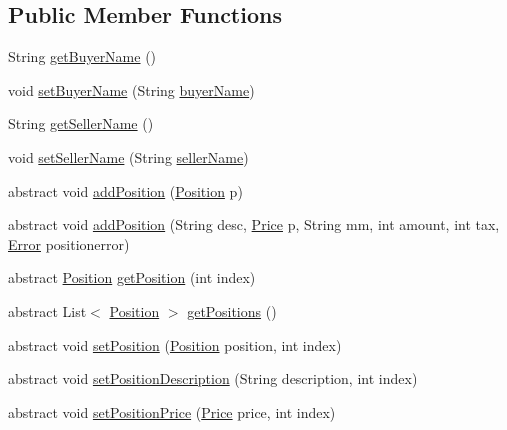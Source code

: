 \subsection*{Public Member Functions}
\begin{DoxyCompactItemize}
\item 
String \hyperlink{class_reduced_invoice_1_1_a_invoice_a0099d82cccbb09bc9240269c76c079d4}{get\+Buyer\+Name} ()
\item 
void \hyperlink{class_reduced_invoice_1_1_a_invoice_ab47710855319e2cf64a829d9bb37d243}{set\+Buyer\+Name} (String \hyperlink{class_reduced_invoice_1_1_a_invoice_ae75bdd20da8fa21dec01c2d032ac11c5}{buyer\+Name})
\item 
String \hyperlink{class_reduced_invoice_1_1_a_invoice_ac8973df8a999bc5556d697ed17c871f7}{get\+Seller\+Name} ()
\item 
void \hyperlink{class_reduced_invoice_1_1_a_invoice_a45129f98801ec280c52c2de35b48da0b}{set\+Seller\+Name} (String \hyperlink{class_reduced_invoice_1_1_a_invoice_ae00a97e1c74841fe0b0b43fccd1da24d}{seller\+Name})
\item 
abstract void \hyperlink{class_reduced_invoice_1_1_a_invoice_a29b30209d39ee91edee303ba5d36fd81}{add\+Position} (\hyperlink{class_reduced_invoice_1_1_position}{Position} p)
\item 
abstract void \hyperlink{class_reduced_invoice_1_1_a_invoice_a0ccc4c6c378676635b552e12c6a7d690}{add\+Position} (String desc, \hyperlink{class_reduced_invoice_1_1_price}{Price} p, String mm, int amount, int tax, \hyperlink{enum_reduced_invoice_1_1_a_invoice_1_1_error}{Error} positionerror)
\item 
abstract \hyperlink{class_reduced_invoice_1_1_position}{Position} \hyperlink{class_reduced_invoice_1_1_a_invoice_a1264648436c734afc549b2d1adb20ff6}{get\+Position} (int index)
\item 
abstract List$<$ \hyperlink{class_reduced_invoice_1_1_position}{Position} $>$ \hyperlink{class_reduced_invoice_1_1_a_invoice_a62a407f4bec81c5dbd392f68ecff6582}{get\+Positions} ()
\item 
abstract void \hyperlink{class_reduced_invoice_1_1_a_invoice_a3abfa40d89bdc9f56daaf73adafcca5e}{set\+Position} (\hyperlink{class_reduced_invoice_1_1_position}{Position} position, int index)
\item 
abstract void \hyperlink{class_reduced_invoice_1_1_a_invoice_a01a6d1c001117851fdcb6941a117c086}{set\+Position\+Description} (String description, int index)
\item 
abstract void \hyperlink{class_reduced_invoice_1_1_a_invoice_a0fb3b8175eac0e76c906a986ba7d6161}{set\+Position\+Price} (\hyperlink{class_reduced_invoice_1_1_price}{Price} price, int index)

\end{DoxyCompactItemize}
